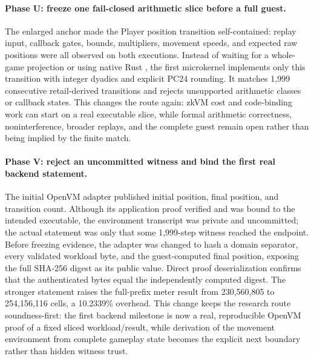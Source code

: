 \paragraph{Phase U: freeze one fail-closed arithmetic slice before a full
guest.}
The enlarged anchor made the Player position transition self-contained: replay
input, callback gates, bounds, multipliers, movement speeds, and expected raw
positions were all observed on both executions.  Instead of waiting for a
whole-game projection or using native Rust , the first microkernel
implements only this transition with integer dyadics and explicit PC24
rounding.  It matches 1,999 consecutive retail-derived transitions and rejects
unsupported arithmetic classes or callback states.  This changes the route
again: zkVM cost and code-binding work can start on a real executable slice,
while formal arithmetic correctness, noninterference, broader replays, and the
complete guest remain open rather than being implied by the finite match.

\paragraph{Phase V: reject an uncommitted witness and bind the first real
backend statement.}
The initial OpenVM adapter published initial position, final position, and
transition count.  Although its application proof verified and was bound to
the intended executable, the environment transcript was private and
uncommitted; the actual statement was only that some 1,999-step witness reached
the endpoint.  Before freezing evidence, the adapter was changed to hash a
domain separator, every validated workload byte, and the guest-computed final
position, exposing the full SHA-256 digest as its public value.  Direct proof
deserialization confirms that the authenticated bytes equal the independently
computed digest.  The stronger statement raises the full-prefix meter result
from 230,560,805 to 254,156,116 cells, a 10.2339\% overhead.  This change keeps
the research route soundness-first: the first backend milestone is now a real,
reproducible OpenVM proof of a fixed sliced workload/result, while derivation of
the movement environment from complete gameplay state becomes the explicit
next boundary rather than hidden witness trust.

